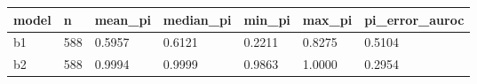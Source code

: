 \begin{tabular}{lllllll}
\hline
model & n & mean\_pi & median\_pi & min\_pi & max\_pi & pi\_error\_auroc \\
\hline
b1 & 588 & 0.5957 & 0.6121 & 0.2211 & 0.8275 & 0.5104 \\
b2 & 588 & 0.9994 & 0.9999 & 0.9863 & 1.0000 & 0.2954 \\
\hline
\end{tabular}

